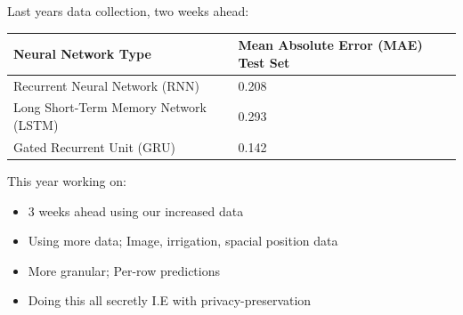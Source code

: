 \documentclass[aspectratio=169]{beamer}
\begin{document}
  \begin{frame}
    Last years data collection, two weeks ahead:
    \begin{table}[]
      \begin{tabular}{l|l}
      Neural Network Type                   & Mean Absolute Error (MAE) Test Set \\ \hline
      Recurrent Neural Network (RNN)        & 0.208                              \\
      Long Short-Term Memory Network (LSTM) & 0.293                              \\
      Gated Recurrent Unit (GRU)            & 0.142
      \end{tabular}
    \end{table}
    This year working on:
    \begin{itemize}
        \item 3 weeks ahead using our increased data
        \item Using more data; Image, irrigation, spacial position data
        \item More granular; Per-row predictions
        \item Doing this all secretly I.E with privacy-preservation
    \end{itemize}
  \end{frame}

\end{document}
